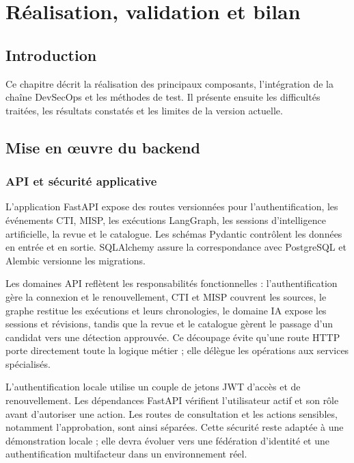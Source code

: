 \chapter{Réalisation, validation et bilan}

\section{Introduction}

Ce chapitre décrit la réalisation des principaux composants, l'intégration de la chaîne DevSecOps et les méthodes de test. Il présente ensuite les difficultés traitées, les résultats constatés et les limites de la version actuelle.

\section{Mise en œuvre du backend}

\subsection{API et sécurité applicative}

L'application FastAPI expose des routes versionnées pour l'authentification, les événements CTI, MISP, les exécutions LangGraph, les sessions d'intelligence artificielle, la revue et le catalogue. Les schémas Pydantic contrôlent les données en entrée et en sortie. SQLAlchemy assure la correspondance avec PostgreSQL et Alembic versionne les migrations.

Les domaines API reflètent les responsabilités fonctionnelles : l'authentification gère la connexion et le renouvellement, CTI et MISP couvrent les sources, le graphe restitue les exécutions et leurs chronologies, le domaine IA expose les sessions et révisions, tandis que la revue et le catalogue gèrent le passage d'un candidat vers une détection approuvée. Ce découpage évite qu'une route HTTP porte directement toute la logique métier ; elle délègue les opérations aux services spécialisés.

L'authentification locale utilise un couple de jetons JWT d'accès et de renouvellement. Les dépendances FastAPI vérifient l'utilisateur actif et son rôle avant d'autoriser une action. Les routes de consultation et les actions sensibles, notamment l'approbation, sont ainsi séparées. Cette sécurité reste adaptée à une démonstration locale ; elle devra évoluer vers une fédération d'identité et une authentification multifacteur dans un environnement réel.

